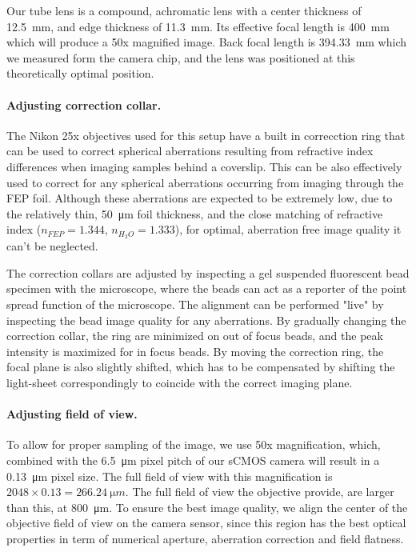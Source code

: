 \documentclass{diploma_style}
\begin{document}
Our tube lens is a compound, achromatic lens with a center thickness of \SI{12.5}{mm}, and edge thickness of \SI{11.3}{mm}. Its effective focal length is \SI{400}{mm} which will produce a 50x magnified image. Back focal length is \SI{394.33}{mm} which we measured form the camera chip, and the lens was positioned at this theoretically optimal position.

\paragraph{Adjusting correction collar.}
The Nikon 25x objectives used for this setup have a built in correcction ring that can be used to correct spherical aberrations resulting from refractive index differences when imaging samples behind a coverslip. This can be also effectively used to correct for any spherical aberrations occurring from imaging through the FEP foil. Although these aberrations are expected to be extremely low, due to the relatively thin, \SI{50}{\micro m} foil thickness, and the close matching of refractive index ($n_{FEP} = 1.344$, $n_{H_2O}=1.333$), for optimal, aberration free image quality it can't be neglected.

The correction collars are adjusted by inspecting a gel suspended fluorescent bead specimen with the microscope, where the beads can act as a reporter of the point spread function of the microscope. The alignment can be performed "live" by inspecting the bead image quality for any aberrations. By gradually changing the correction collar, the ring are minimized on out of focus beads, and the peak intensity is maximized for in focus beads. By moving the correction ring, the focal plane is also slightly shifted, which has to be compensated by shifting the light-sheet correspondingly to coincide with the correct imaging plane.

\paragraph{Adjusting field of view.}
To allow for proper sampling of the image, we use 50x magnification, which, combined with the \SI{6.5}{\micro m} pixel pitch of our sCMOS camera will result in a \SI{0.13}{\micro m} pixel size. The full field of view with this magnification is $2048 \times 0.13 = \SI{266.24}{\micro m}$. The full field of view the objective provide, are larger than this, at \SI{800}{\micro m}. To ensure the best image quality, we align the center of the objective field of view on the camera sensor, since this region has the best optical properties in term of numerical aperture, aberration correction and field flatness.
\end{document}

